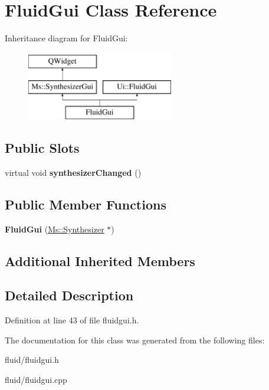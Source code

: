 \hypertarget{class_fluid_gui}{}\section{Fluid\+Gui Class Reference}
\label{class_fluid_gui}
Inheritance diagram for Fluid\+Gui\+:\begin{figure}[H]
\begin{center}
\leavevmode
\includegraphics[height=3.000000cm]{class_fluid_gui}
\end{center}
\end{figure}
\subsection*{Public Slots}
\begin{DoxyCompactItemize}
\item 
\mbox{\label{class_fluid_gui_a962d5382ee1bd33231e5ce702fae0dc2}} 
virtual void {\bfseries synthesizer\+Changed} ()
\end{DoxyCompactItemize}
\subsection*{Public Member Functions}
\begin{DoxyCompactItemize}
\item 
\mbox{\label{class_fluid_gui_acbcc05cbf8468ee7f58b530a90c28f4e}} 
{\bfseries Fluid\+Gui} (\hyperlink{class_ms_1_1_synthesizer}{Ms\+::\+Synthesizer} $\ast$)
\end{DoxyCompactItemize}
\subsection*{Additional Inherited Members}


\subsection{Detailed Description}


Definition at line 43 of file fluidgui.\+h.



The documentation for this class was generated from the following files\+:\begin{DoxyCompactItemize}
\item 
fluid/fluidgui.\+h\item 
fluid/fluidgui.\+cpp\end{DoxyCompactItemize}
